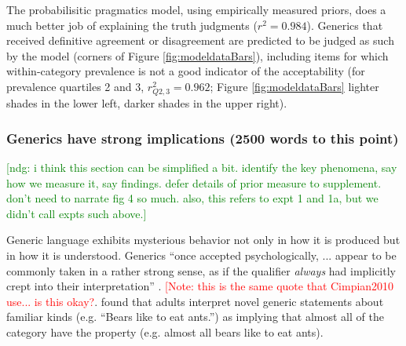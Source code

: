 \documentclass[10pt,letterpaper]{article}
\newcommand{\red}[1]{\textcolor{Red}{#1}}
\newcommand{\ndg}[1]{\textcolor{Green}{[ndg: #1]}}
\begin{document}
The probabilisitic pragmatics model, using empirically measured priors, does a much better job of explaining the truth judgments ($r^2=0.984$). 
Generics that received definitive agreement or disagreement are predicted to be judged as such by the model (corners of Figure \ref{fig:modeldataBars}), including items for which within-category prevalence is not a good indicator of the acceptability (for prevalence quartiles 2 and 3, $r_{Q2,3}^2=0.962$; Figure \ref{fig:modeldataBars} lighter shades in the lower left, darker shades in the upper right). 

\subsubsection{Generics have strong implications (2500 words to this point)} 

\ndg{i think this section can be simplified a bit. identify the key phenomena, say how we measure it, say findings. defer details of prior measure to supplement. don't need to narrate fig 4 so much. 
also, this refers to expt 1 and 1a, but we didn't call expts such above.}

Generic language exhibits mysterious behavior not only in how it is produced but in how it is understood.
Generics ``once accepted psychologically, ... appear to be commonly taken in a rather strong sense, as if the qualifier \emph{always} had implicitly crept into their interpretation'' \cite{Abelson1966}. \red{[Note: this is the same quote that Cimpian2010 use... is this okay?}.
%
 found that adults interpret novel generic statements about familiar kinds (e.g. ``Bears like to eat ants.'') as implying that almost all of the category have the property (e.g. almost all bears like to eat ants).
\end{document}
